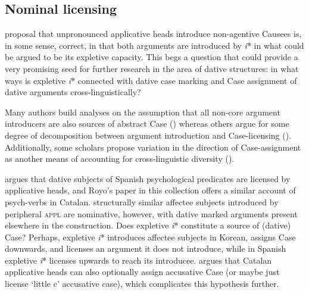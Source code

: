 \documentclass[output=paper,modfonts,nonflat,colorlinks,citecolor=brown]{langsci/langscibook}
\begin{document}
\subsection{Nominal licensing}\label{sec:wechsler:4.2}

 proposal that unpronounced applicative heads introduce non-agen\-tive Causees is, in some sense, correct, in that both arguments are introduced by \textit{i}* in what could be argued to be its expletive capacity. This begs a question that could provide a very promising seed for further research in the area of dative structures: in what ways is expletive \textit{i}* connected with dative case marking and Case assignment of dative arguments cross-linguistically?



Many authors build analyses on the assumption that all non-core argument introducers are also sources of abstract Case (\citealt{MchomboFirmino1999,Jeong2007,Cuervo2003,Cuervo2010born,Cuervo2015,Sheehan2013,vanderWal2017}) whereas others argue for some degree of decomposition between argument introduction and Case-licensing (\citealt{BakerCollins2006,GeorgalaEtAl2008,Georgala2012,HaddicanHolmberg2012,Halpert2012,Wechsler2014,Wechsler2016}). Additionally, some scholars propose variation in the direction of Case-assignment as another means of accounting for cross-linguistic diversity (\citealt{Sheehan2013,vanderWal2017,Baker2008}).



\citet{Cuervo2003,Cuervo2010born} argues that dative subjects of Spanish psychological predicates are licensed by applicative heads, and Royo’s paper in this collection offers a similar account of psych-verbs in Catalan.  structurally similar affectee subjects introduced by peripheral \textsc{appl} are nominative, however, with dative marked arguments present elsewhere in the construction. Does expletive \textit{i}* constitute a source of (dative) Case? Perhaps, expletive \textit{i}* introduces affectee subjects in Korean, assigns Case downwards, and licenses an argument it does not introduce, while in Spanish expletive \textit{i}* licenses upwards to reach its introducee.  argues that Catalan applicative heads can also optionally assign accusative Case (or maybe just license ‘little c’ accusative case), which complicates this hypothesis further.
\end{document}
